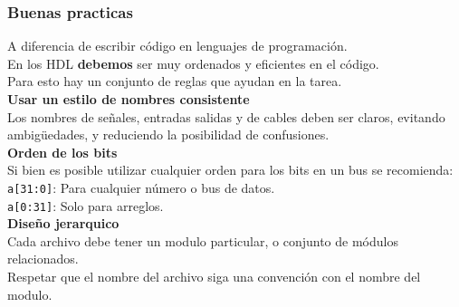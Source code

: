 \documentclass[aspectratio=169]{beamer}
\begin{document}
\begin{frame}[fragile,t]
    \frametitle{Buenas practicas}
    A diferencia de escribir código en lenguajes de programación.\\
    En los HDL \textbf{debemos} ser muy ordenados y eficientes en el código.\\
    \textcolor{verdeuca}{Para esto hay un conjunto de reglas que ayudan en la tarea.\\}
    \bigskip
    \pause
    \textcolor{naranjauca}{\textbf{Usar un estilo de nombres consistente}}\\
    Los nombres de señales, entradas salidas y de cables deben ser claros,
    evitando ambigüedades, y reduciendo la posibilidad de confusiones.\\
    \bigskip
    \pause
    \textcolor{naranjauca}{\textbf{Orden de los bits}}\\
    Si bien es posible utilizar cualquier orden para los bits en un bus se recomienda:\\
    \texttt{a[31:0]}: Para cualquier número o bus de datos.\\
    \texttt{a[0:31]}: Solo para arreglos.\\
    \bigskip 
    \pause
    \textcolor{naranjauca}{\textbf{Diseño jerarquico}}\\
    Cada archivo debe tener un modulo particular, o conjunto de módulos relacionados.\\
    Respetar que el nombre del archivo siga una convención con el nombre del modulo.
\end{frame}
\end{document}
